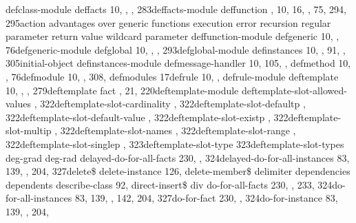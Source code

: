 \documentclass[letterpaper,10pt,english]{sphinxmanual}
\begin{document}
defclass-module deffacts 10, , ,
283deffacts-module deffunction , 10, 16, , 75, 294,
295action advantages over generic functions execution
error recursion regular parameter return value
wildcard parameter deffunction-module
defgeneric 10, , 76defgeneric-module defglobal
10, , , 293defglobal-module definstances 10,
, 91, , 305initial-object definstances-module
defmessage-handler 10, 105, , defmethod 10,
, 76defmodule 10, , 308, defmodules 17defrule 10,
, defrule-module deftemplate 10, , ,
279deftemplate fact , 21, 220deftemplate-module
deftemplate-slot-allowed-values ,
322deftemplate-slot-cardinality , 322deftemplate-slot-defaultp
, 322deftemplate-slot-default-value ,
322deftemplate-slot-existp , 322deftemplate-slot-multip ,
322deftemplate-slot-names , 322deftemplate-slot-range ,
322deftemplate-slot-singlep , 323deftemplate-slot-type
323deftemplate-slot-types deg-grad deg-rad
delayed-do-for-all-facts 230, ,
324delayed-do-for-all-instances 83, 139, , 204, 327delete\$
delete-instance 126, delete-member\$ delimiter
dependencies dependents describe-class 92,
direct-insert\$ div do-for-all-facts 230,
, 233, 324do-for-all-instances 83, 139, , 142, 204,
327do-for-fact 230, , 324do-for-instance 83, 139, , 204,
\end{document}
